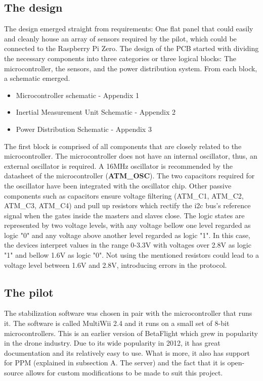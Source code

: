 \documentclass{IEEEtran}
\begin{document}
\subsection*{The design}
\noindent The design emerged straight from requirements: One flat panel that could easily and cleanly house an array of sensors required by the pilot, which could be connected to the Raspberry Pi Zero.
\newline
\newline
The design of the PCB started with dividing the necessary components into three categories or three logical blocks: The microcontroller, the sensors, and the power distribution system. From each block, a schematic emerged.
\begin{itemize}
    \item Microcontroller schematic - Appendix 1 
    \item Inertial Measurement Unit Schematic - Appendix 2
    \item Power Distribution Schematic - Appendix 3
\end{itemize}
The first block is comprised of all components that are closely related to the microcontroller. The microcontroller does not have an internal oscillator, thus, an external oscillator is required. A 16MHz oscillator is recommended by the datasheet of the microcontroller (\textbf{ATM\_OSC}). The two capacitors required for the oscillator have been integrated with the oscillator chip. Other passive components such as capacitors ensure voltage filtering (ATM\_C1, ATM\_C2, ATM\_C3, ATM\_C4) and pull up resistors which rectify the i2c bus's reference signal when the gates inside the masters and slaves close. The logic states are represented by two voltage levels, with any voltage bellow one level regarded as logic "0" and any voltage above another level regarded as logic "1". In this case, the devices interpret values in the range 0-3.3V with voltages over 2.8V as logic "1" and bellow 1.6V as logic "0".  Not using the mentioned resistors could lead to a voltage level between 1.6V and 2.8V, introducing errors in the protocol.
\subsection*{The pilot}
The stabilization software was chosen in pair with the microcontroller that runs it. The software is called MultiWii 2.4 \citep{a2020_multiwii} and it runs on a small set of 8-bit microcontrollers. This is an earlier version of BetaFlight \citep{betaflight_2020_betaflightbetaflight} which grew in popularity in the drone industry. Due to its wide popularity in 2012, it has great documentation and its relatively easy to use. What is more, it also has support for PPM (explained in subsection A. The server) and the fact that it is open-source allows for custom modifications to be made to suit this project.
\end{document}
